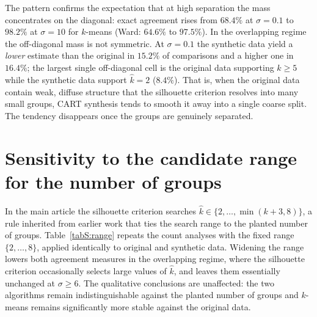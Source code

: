 \documentclass[pdflatex,sn-basic]{sn-jnl}
\begin{document}
The pattern confirms the expectation that at high separation the mass
concentrates on the diagonal: exact agreement rises from $68.4\%$ at
$\sigma = 0.1$ to $98.2\%$ at $\sigma = 10$ for $k$-means (Ward: $64.6\%$ to
$97.5\%$). In the overlapping regime the off-diagonal mass is not symmetric.
At $\sigma = 0.1$ the synthetic data yield a \emph{lower} estimate than the
original in $15.2\%$ of comparisons and a higher one in $16.4\%$; the largest
single off-diagonal cell is the original data supporting $\hat{k} \ge 5$ while
the synthetic data support $\hat{k} = 2$ ($8.4\%$). That is, when the original
data contain weak, diffuse structure that the silhouette criterion resolves
into many small groups, CART synthesis tends to smooth it away into a single
coarse split. The tendency disappears once the groups are genuinely separated.

\begin{table}[h]
\centering
\caption{Agreement in the estimated number of groups between original and
  synthetic data, by separation. Rows are $\hat{k}$ from the original data,
  columns $\hat{k}$ from the synthetic data; cells are percentages of all
  comparisons at that separation (each block sums to $100\%$). Estimates of
  five or more groups are pooled for display, but the agreement column is
  computed on unpooled values. Both data sources are searched over a fixed
  range $\hat{k} \in \{2,\dots,8\}$, so the comparison is symmetric; under the
  narrower per-scenario range used for the recovery rates in the main text,
  agreement is higher in the overlapping regime ($75.1\%$ and $67.6\%$ at
  $\sigma = 0.1$, $79.7\%$ and $75.9\%$ at $\sigma = 2$, for $k$-means and Ward
  respectively) and essentially unchanged at $\sigma \ge 6$, where the two
  conventions differ by at most $0.1$ percentage points.
  $n = 180{,}000$ comparisons per separation level.}
\label{tabS:khat}
\small

\end{table}


\section{Sensitivity to the candidate range for the number of groups}

In the main article the silhouette criterion searches
$\hat{k} \in \{2,\dots,\min(k+3,8)\}$, a rule inherited from earlier work that
ties the search range to the planted number of groups. Table~\ref{tabS:range}
repeats the count analyses with the fixed range $\{2,\dots,8\}$, applied
identically to original and synthetic data. Widening the range lowers both
agreement measures in the overlapping regime, where the silhouette criterion
occasionally selects large values of $\hat{k}$, and leaves them essentially
unchanged at $\sigma \ge 6$. The qualitative conclusions are unaffected: the
two algorithms remain indistinguishable against the planted number of groups
and $k$-means remains significantly more stable against the original data.
\end{document}
